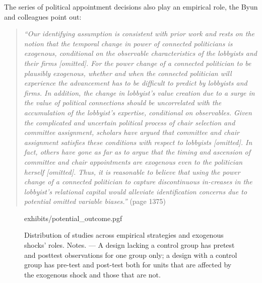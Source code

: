 \documentclass[11pt]{article}
\begin{document}
\begin{refsection}
The series of political appointment decisions also play an empirical role, the 
Byun and colleagues point out: 

\begin{quote}
  \textit{
    ``Our identifying assumption is consistent with prior work and rests on the
    notion that the temporal change in power of connected politicians is
    exogenous, conditional on the observable characteristics of the lobbyists
    and their firms [omitted]. For the power change of a connected politician to
    be plausibly exogenous, whether and when the connected politician will
    experience the advancement has to be difficult to predict by lobbyists and
    firms. In addition, the change in lobbyist's value creation due to a surge
    in the value of political connections should be uncorrelated with the
    accumulation of the lobbyist's expertise, conditional on observables. Given
    the complicated and uncertain political process of chair selection and
    committee assignment, scholars have argued that committee and chair
    assignment satisfies these conditions with respect to lobbyists [omitted].
    In fact, others have gone as far as to argue that the timing and ascension
    of committee and chair appointments are exogenous even to the politician
    herself [omitted]. Thus, it is reasonable to believe that using the power
    change of a connected politician to capture discontinuous in-creases in the
    lobbyist's relational capital would alleviate identification concerns due to
    potential omitted variable biases.''
  }
  (page 1375)
\end{quote}

\begin{figure}
  \raggedleft
  \begin{small}
    {exhibits/potential_outcome.pgf}
    \caption{
      Distribution of studies across empirical strategies and exogenous shocks'
      roles. Notes. --- A design lacking a control group has pretest and posttest
      observations for one group only; a design with a control group has
      pre-test and post-test both for units that are affected by the exogenous
      shock and those that are not.
    }
    \label{fig:potential_outcome}
  \end{small}
\end{figure}


\end{refsection}
\end{document}
